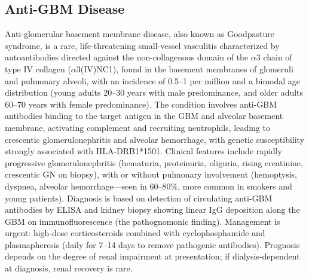 \subsection{Anti-GBM Disease}
\label{sec:Anti-GBM Disease (Goodpasture Syndrome)}
Anti-glomerular basement membrane disease, also known as Goodpasture syndrome, is a rare, life-threatening small-vessel vasculitis characterized by autoantibodies directed against the non-collagenous domain of the $\alpha$3 chain of type IV collagen ($\alpha$3(IV)NC1), found in the basement membranes of glomeruli and pulmonary alveoli, with an incidence of 0.5--1 per million and a bimodal age distribution (young adults 20--30 years with male predominance, and older adults 60--70 years with female predominance). The condition involves anti-GBM antibodies binding to the target antigen in the GBM and alveolar basement membrane, activating complement and recruiting neutrophils, leading to crescentic glomerulonephritis and alveolar hemorrhage, with genetic susceptibility strongly associated with HLA-DRB1*1501. Clinical features include rapidly progressive glomerulonephritis (hematuria, proteinuria, oliguria, rising creatinine, crescentic GN on biopsy), with or without pulmonary involvement (hemoptysis, dyspnea, alveolar hemorrhage---seen in 60--80\%, more common in smokers and young patients). Diagnosis is based on detection of circulating anti-GBM antibodies by ELISA and kidney biopsy showing linear IgG deposition along the GBM on immunofluorescence (the pathognomonic finding). Management is urgent: high-dose corticosteroids combined with cyclophosphamide and plasmapheresis (daily for 7--14 days to remove pathogenic antibodies). Prognosis depends on the degree of renal impairment at presentation; if dialysis-dependent at diagnosis, renal recovery is rare.

